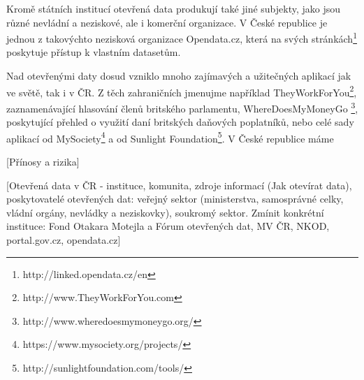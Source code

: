 Kromě státních institucí otevřená data produkují také jiné subjekty, jako jsou různé nevládní a neziskové, ale i komerční organizace. V České republice je jednou z takovýchto nezisková organizace Opendata.cz, která na svých stránkách\footnote{http://linked.opendata.cz/en} poskytuje přístup k vlastním datasetům.

Nad otevřenými daty dosud vzniklo mnoho zajímavých a užitečných aplikací jak ve světě, tak i v ČR. Z těch zahraničních jmenujme například TheyWorkForYou\footnote{http://www.TheyWorkForYou.com}, zaznamenávající hlasování členů britského parlamentu, WhereDoesMyMoneyGo \footnote{http://www.wheredoesmymoneygo.org/}, poskytující přehled o využití daní britských daňových poplatníků, nebo celé sady aplikací od MySociety\footnote{https://www.mysociety.org/projects/} a od Sunlight Foundation\footnote{http://sunlightfoundation.com/tools/}. V České republice máme

[Přínosy a rizika]

[Otevřená data v ČR - instituce, komunita, zdroje informací (Jak otevírat data), poskytovatelé otevřených dat: veřejný sektor (ministerstva, samosprávné celky, vládní orgány, nevládky a neziskovky), soukromý sektor.
Zmínit konkrétní instituce: Fond Otakara Motejla a Fórum otevřených dat, MV ČR, NKOD, portal.gov.cz, opendata.cz]